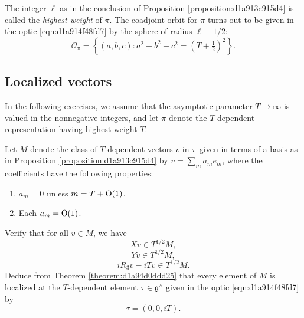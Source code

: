 \documentclass[reqno]{amsart} 
\numberwithin{equation}{section}
\begin{document}
The integer $\ell$ as in the conclusion of Proposition \ref{proposition:d1a913c915d4} is called the \emph{highest weight} of $\pi$.  The coadjoint orbit for $\pi$ turns out to be given in the optic \eqref{eqn:d1a914f48fd7} by the sphere of radius $\ell + 1/2$:
\begin{equation*}
  \mathcal{O}_\pi = \left\{ (a,b,c) : a^2 + b^2 + c^2 = (T + \tfrac{1}{2} )^2 \right\}.
\end{equation*}

\subsection{Localized vectors}\label{sec:d1a9162ebd8a}
In the following exercises, we assume that the asymptotic parameter $T \rightarrow \infty$ is valued in the nonnegative integers, and let $\pi$ denote the $T$-dependent representation having highest weight $T$.

\begin{exercise}\label{exercise:d1a913e1e9ec}
  Let $M$ denote the class of $T$-dependent vectors $v$ in $\pi$ given in terms of a basis as in Proposition \ref{proposition:d1a913c915d4} by $v = \sum_m a_m e_m$, where the coefficients have the following properties:
  \begin{enumerate}
  \item $a_m = 0$ unless $m = T + \operatorname{O}(1)$.
  \item Each $a_m = \operatorname{O}(1)$.
  \end{enumerate}
  Verify that for all $v \in M$, we have
  \begin{equation*}
    X v \in T^{1/2} M,
  \end{equation*}
  \begin{equation*}
    Y v \in T^{1/2} M,
  \end{equation*}
  \begin{equation*}
    i R_3 v - i T v \in T^{1/2} M.
  \end{equation*}
  Deduce from Theorem \ref{theorem:d1a94d0ddd25} that every element of $M$ is localized at the $T$-dependent element $\tau \in \mathfrak{g}^\wedge$ given in the optic \eqref{eqn:d1a914f48fd7} by
  \begin{equation*}
    \tau = (0,0,i T).
  \end{equation*}
\end{exercise}
\end{document}
